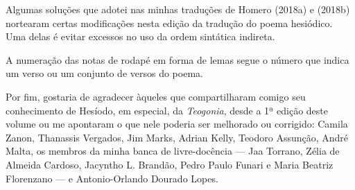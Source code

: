 Algumas soluções que adotei nas minhas traduções de Homero (2018a) e
(2018b) nortearam certas modificações nesta edição da tradução do poema
hesiódico. Uma delas é evitar excessos no uso da ordem sintática
indireta.

A numeração das notas de rodapé em forma de lemas segue o número que
indica um verso ou um conjunto de versos do poema.

Por fim, gostaria de agradecer àqueles que compartilharam comigo seu
conhecimento de Hesíodo, em especial, da \textit{Teogonia}, desde a 1ª
edição deste volume ou me apontaram o que nele poderia ser melhorado ou
corrigido: Camila Zanon, Thanassis Vergados, Jim Marks, Adrian Kelly,
Teodoro Assunção, André Malta, os membros da minha banca de
livre-docência --- Jaa Torrano, Zélia de Almeida Cardoso, Jacyntho L.
Brandão, Pedro Paulo Funari e Maria Beatriz Florenzano --- e
Antonio-Orlando Dourado Lopes.

